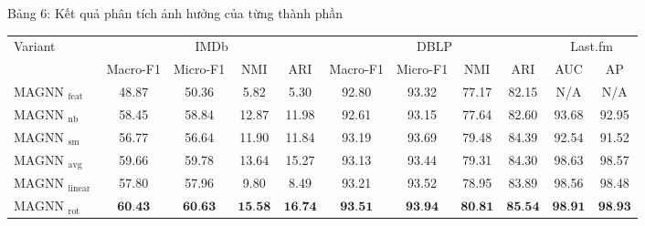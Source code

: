 Bảng 6: Kết quả phân tích ảnh hưởng của từng thành phần
\begin{center}
\begin{tabular}{|l|c|c|c|c|c|c|c|c|c|c|}
\hline
\multirow{2}{*}{Variant} & \multicolumn{4}{|c|}{IMDb} & \multicolumn{4}{c|}{DBLP} & \multicolumn{2}{c|}{Last.fm} \\
\cline { 2 - 11 }
 & Macro-F1 & Micro-F1 & NMI & ARI & Macro-F1 & Micro-F1 & NMI & ARI & AUC & AP \\
\hline
MAGNN $_{\text {feat }}$ & 48.87 & 50.36 & 5.82 & 5.30 & 92.80 & 93.32 & 77.17 & 82.15 & N/A & N/A \\
\hline
MAGNN $_{\text {nb }}$ & 58.45 & 58.84 & 12.87 & 11.98 & 92.61 & 93.15 & 77.64 & 82.60 & 93.68 & 92.95 \\
\hline
MAGNN $_{\text {sm }}$ & 56.77 & 56.64 & 11.90 & 11.84 & 93.19 & 93.69 & 79.48 & 84.39 & 92.54 & 91.52 \\
\hline
MAGNN $_{\text {avg }}$ & 59.66 & 59.78 & 13.64 & 15.27 & 93.13 & 93.44 & 79.31 & 84.30 & 98.63 & 98.57 \\
\hline
MAGNN $_{\text {linear }}$ & 57.80 & 57.96 & 9.80 & 8.49 & 93.21 & 93.52 & 78.95 & 83.89 & 98.56 & 98.48 \\
\hline
MAGNN $_{\text {rot }}$ & $\mathbf{6 0 . 4 3}$ & $\mathbf{6 0 . 6 3}$ & $\mathbf{1 5 . 5 8}$ & $\mathbf{1 6 . 7 4}$ & $\mathbf{9 3 . 5 1}$ & $\mathbf{9 3 . 9 4}$ & $\mathbf{8 0 . 8 1}$ & $\mathbf{8 5 . 5 4}$ & $\mathbf{9 8 . 9 1}$ & $\mathbf{9 8 . 9 3}$ \\
\hline
\end{tabular}
\end{center}
